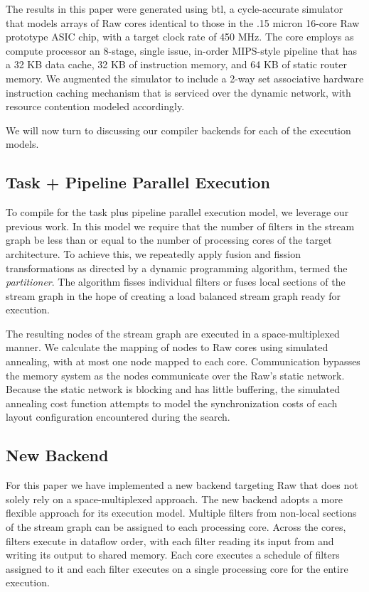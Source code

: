 The results in this paper were generated using btl, a cycle-accurate
simulator that models arrays of Raw cores identical to those in the
.15 micron 16-core Raw prototype ASIC chip, with a target clock rate
of 450 MHz. The core employs as compute processor an 8-stage, single
issue, in-order MIPS-style pipeline that has a 32 KB data cache, 32 KB
of instruction memory, and 64 KB of static router memory.  We
augmented the simulator to include a 2-way set associative hardware
instruction caching mechanism that is serviced over the dynamic
network, with resource contention modeled accordingly. 

We will now turn to discussing our compiler backends for each of the
execution models.

\subsection{Task + Pipeline Parallel Execution}
\label{sec:space-imp}
To compile for the task plus pipeline parallel execution model, we
leverage our previous work\cite{streamit-asplos}. In this model we
require that the number of filters in the stream graph be less than or
equal to the number of processing cores of the target architecture.
To achieve this, we repeatedly apply fusion and fission
transformations as directed by a dynamic programming algorithm, termed
the {\it partitioner}.  The algorithm fisses individual filters or
fuses local sections of the stream graph in the hope of creating a
load balanced stream graph ready for execution.

The resulting nodes of the stream graph are executed in a
space-multiplexed manner.  We calculate the mapping of nodes to Raw
cores using simulated annealing, with at most one node mapped to each
core.  Communication bypasses the memory system as the nodes
communicate over the Raw's static network.  Because the static network
is blocking and has little buffering, the simulated annealing cost
function attempts to model the synchronization costs of each layout
configuration encountered during the search. 

\subsection{New Backend}
For this paper we have implemented a new backend targeting Raw that
does not solely rely on a space-multiplexed approach.  The new backend
adopts a more flexible approach for its execution model. Multiple
filters from non-local sections of the stream graph can be assigned to
each processing core.  Across the cores, filters execute in dataflow
order, with each filter reading its input from and writing its output
to shared memory. Each core executes a schedule of filters assigned to
it and each filter executes on a single processing core for the entire
execution.

